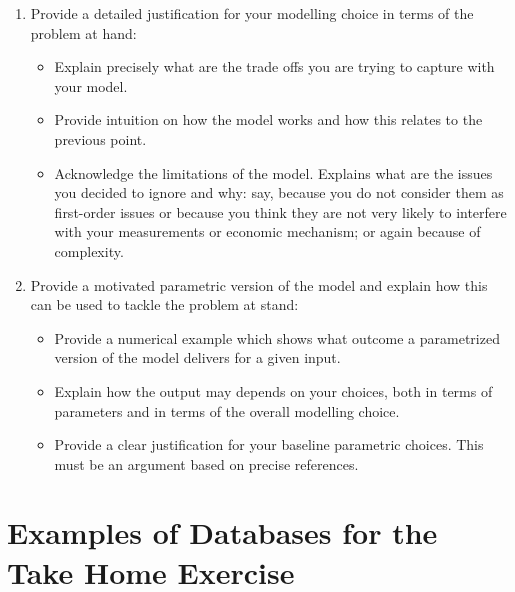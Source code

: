 \documentclass[11pt,a4paper]{article}
\begin{document}
\begin{enumerate}
    \item Provide a detailed justification for your modelling choice in terms of the problem at hand:
    \begin{itemize}
        \item Explain precisely what are the trade offs you are trying to capture with your model.
        \item Provide intuition on how the model works and how this relates to the previous point.
        \item Acknowledge the limitations of the model. Explains what are the issues you decided to ignore and why: say, because you do not consider them as first-order issues or because you think they are not very likely to interfere with your measurements or economic mechanism; or again because of complexity.
    \end{itemize}

    \item Provide a motivated parametric version of the model and explain how this can be used to tackle the problem at stand:
    \begin{itemize}
        \item Provide a numerical example which shows what outcome a parametrized version of the model delivers for a given input.
        \item Explain how the output may depends on your choices, both in terms of parameters and in terms of the overall modelling choice.
        \item Provide a clear justification for your baseline parametric choices. This must be an argument based on precise references.
    \end{itemize}
\end{enumerate}

\newpage


\section*{Examples of Databases for the Take Home Exercise}
\end{document}

